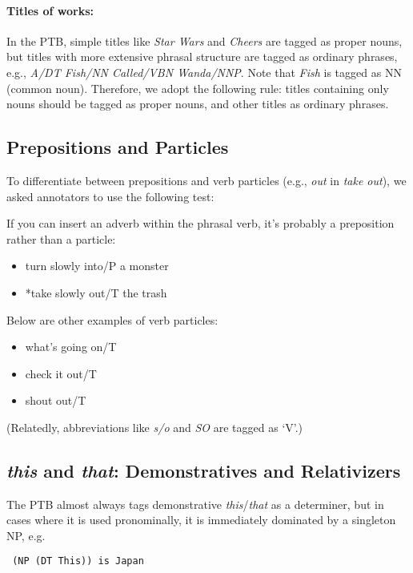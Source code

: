 \documentclass[11pt,letterpaper]{article}
\begin{document}
\paragraph{Titles of works:} In the PTB, simple titles like \emph{Star Wars} and \emph{Cheers} are tagged as proper nouns, but titles with more extensive phrasal structure are tagged as ordinary phrases, e.g., \emph{A/DT Fish/NN Called/VBN Wanda/NNP}. Note that \emph{Fish} is tagged as NN (common noun). Therefore, we adopt the following rule: titles containing only nouns should be tagged as proper nouns, and other titles as ordinary phrases.

\subsection{Prepositions and Particles}

To differentiate between prepositions and verb particles (e.g., \emph{out} in \emph{take out}), we asked annotators to use the following test: 

If you can insert an adverb within the phrasal verb, it's probably a preposition rather than a particle:
\begin{itemize}
\item turn slowly into/P a monster
\item *take slowly out/T the trash
\end{itemize}

\noindent Below are other examples of verb particles:
\begin{itemize}
\item what's going on/T
\item check it out/T
\item shout out/T
\end{itemize}
(Relatedly, abbreviations like \emph{s/o} and \emph{SO} are tagged as `V'.)


\subsection{\emph{this} and \emph{that}: Demonstratives and Relativizers}

The PTB almost always tags demonstrative \emph{this}/\emph{that} as a determiner, but in cases where it is 
used pronominally, it is immediately dominated by a singleton NP, e.g.

\begin{verbatim} (NP (DT This)) is Japan\end{verbatim}
\end{document}
